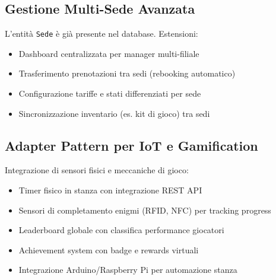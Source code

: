 \subsection{Gestione Multi-Sede Avanzata}
L'entità \texttt{Sede} è già presente nel database. Estensioni:
\begin{itemize}
    \item Dashboard centralizzata per manager multi-filiale
    \item Trasferimento prenotazioni tra sedi (rebooking automatico)
    \item Configurazione tariffe e stati differenziati per sede
    \item Sincronizzazione inventario (es. kit di gioco) tra sedi
\end{itemize}

\subsection{Adapter Pattern per IoT e Gamification}
Integrazione di sensori fisici e meccaniche di gioco:
\begin{itemize}
    \item Timer fisico in stanza con integrazione REST API
    \item Sensori di completamento enigmi (RFID, NFC) per tracking progress
    \item Leaderboard globale con classifica performance giocatori
    \item Achievement system con badge e rewards virtuali
    \item Integrazione Arduino/Raspberry Pi per automazione stanza
\end{itemize}
